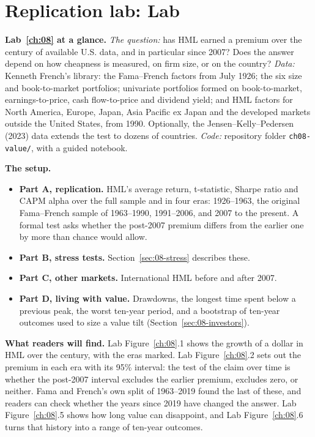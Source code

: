 \section{Replication lab: Lab~\thechapter}
\label{sec:08-lab}

\begin{callout}
\textbf{Lab~\ref{ch:08} at a glance.} \emph{The question:} has HML earned a premium over the century of available U.S. data, and in particular since 2007? Does the answer depend on how cheapness is measured, on firm size, or on the country? \emph{Data:} Kenneth French's library: the Fama--French factors from July 1926; the six size and book-to-market portfolios; univariate portfolios formed on book-to-market, earnings-to-price, cash flow-to-price and dividend yield; and HML factors for North America, Europe, Japan, Asia Pacific ex Japan and the developed markets outside the United States, from 1990. Optionally, the Jensen--Kelly--Pedersen (2023) data extends the test to dozens of countries. \emph{Code:} repository folder \texttt{ch08-value/}, with a guided notebook.
\end{callout}

\textbf{The setup.}

\begin{itemize}
  \item \textbf{Part A, replication.} HML's average return, t-statistic, Sharpe ratio and CAPM alpha over the full sample and in four eras: 1926--1963, the original Fama--French sample of 1963--1990, 1991--2006, and 2007 to the present. A formal test asks whether the post-2007 premium differs from the earlier one by more than chance would allow.
  \item \textbf{Part B, stress tests.} Section~\ref{sec:08-stress} describes these.
  \item \textbf{Part C, other markets.} International HML before and after 2007.
  \item \textbf{Part D, living with value.} Drawdowns, the longest time spent below a previous peak, the worst ten-year period, and a bootstrap of ten-year outcomes used to size a value tilt (Section~\ref{sec:08-investors}).
\end{itemize}

\textbf{What readers will find.} Lab Figure~\ref{ch:08}.1 shows the growth of a dollar in HML over the century, with the eras marked. Lab Figure~\ref{ch:08}.2 sets out the premium in each era with its 95\% interval: the test of the claim over time is whether the post-2007 interval excludes the earlier premium, excludes zero, or neither. Fama and French's own split of 1963--2019 found the last of these, and readers can check whether the years since 2019 have changed the answer. Lab Figure~\ref{ch:08}.5 shows how long value can disappoint, and Lab Figure~\ref{ch:08}.6 turns that history into a range of ten-year outcomes.

